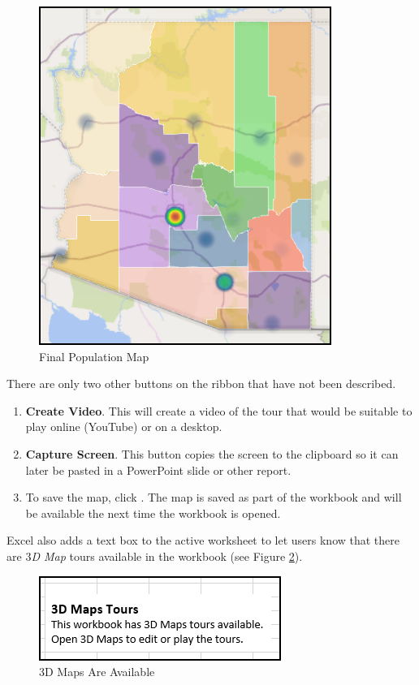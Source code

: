 \begin{figure}[H]
	\centering
	\includegraphics[width=\maxwidth{.50\linewidth}]{gfx/ch08_fig29}
	\caption{Final Population Map}
	\label{08:fig29}
\end{figure}

There are only two other buttons on the ribbon that have not been described.

\begin{enumbox}
	\begin{enumerate}
		\item \textbf{Create Video}. This will create a video of the tour that would be suitable to play online (YouTube) or on a desktop.
		\item \textbf{Capture Screen}. This button copies the screen to the clipboard so it can later be pasted in a PowerPoint slide or other report.
		\item To save the map, click . The map is saved as part of the workbook and will be available the next time the workbook is opened. 
	\end{enumerate}
\end{enumbox}

Excel also adds a text box to the active worksheet to let users know that there are \textit{$ 3 $D Map} tours available in the workbook (see Figure \ref{08:fig30}).

\begin{figure}[H]
	\centering
	\includegraphics[width=\maxwidth{.65\linewidth}]{gfx/ch08_fig30}
	\caption{$ 3 $D Maps Are Available}
	\label{08:fig30}
\end{figure}

